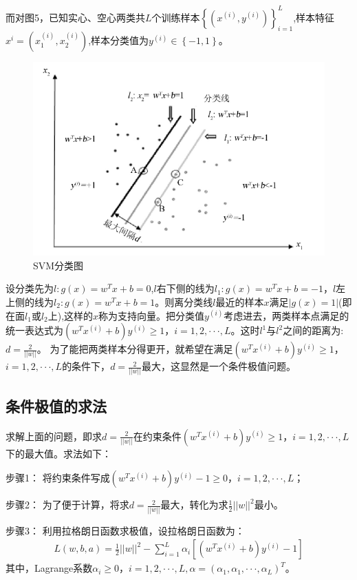\documentclass[12pt,a4paper]{article}%
\begin{document}
	而对图5，已知实心、空心两类共$L$个训练样本${\left\{\left({x}^{(i)},{y}^{(i)} \right) \right\}}_{i=1}^{L}$,样本特征${x}^{i}={\left({x}_1^{(i)},{x}_2^{(i)}\right)}$,样本分类值为${y}^{(i)}{\in}{\left\{-1,1\right\}} $。
	\begin{figure}[H]%
		\centering
		\begin{minipage}{0.83\textwidth}%
			\centering
			\includegraphics[width=0.8%
			\textwidth]{figure7}%
			\caption{\fontsize{10pt}{15pt}\selectfont SVM分类图}%
		\end{minipage}
	\end{figure}
	设分类先为$l:g(x)={w}^{T}x+b=0$,$l$右下侧的线为${l}_{1}:g(x)={w}^{T}x+b=-1$，$l$左上侧的线为${l}_{2}:g(x)={w}^{T}x+b=1$。则离分类线$l$最近的样本$x$满足$\left|g(x)=1\right|$(即在面${l}_{1}$或${l}_{2}$上),这样的$x$称为支持向量。把分类值${y}^{(i)}$考虑进去，两类样本点满足的统一表达式为${({w}^{T}{x}^{(i)}+b){y}^{(i)}\geq1}$，$i=1,2,···,L$。这时${l}^{1}$与${l}^{2}$之间的距离为:$d=\frac{2}{||w||}$。
	为了能把两类样本分得更开，就希望在满足${({w}^{T}{x}^{(i)}+b){y}^{(i)}\geq1}$，$i=1,2,···,L$的条件下，$d=\frac{2}{||w||}$最大，这显然是一个条件极值问题。
	\subsection{条件极值的求法}
	求解上面的问题，即求$d=\frac{2}{||w||}$在约束条件${({w}^{T}{x}^{(i)}+b){y}^{(i)}\geq1}$，$i=1,2,···,L$下的最大值。求法如下：
	
	步骤1： 将约束条件写成${({w}^{T}{x}^{(i)}+b){y}^{(i)}-1\geq0}$，$i=1,2,···,L$；
	
	步骤2： 为了便于计算，将求$d=\frac{2}{||w||}$最大，转化为求$\frac{1}{2}{||w||}^{2}$最小。
	
	步骤3：
	利用拉格朗日函数求极值，设拉格朗日函数为：
	\begin{align}
		L(w,b,a)=\frac{1}{2}{||w||}^{2}-\sum_{i=1}^{L} {\alpha}_{i}\left[{({w}^{T}{x}^{(i)}+b){y}^{(i)}-1}\right]
	\end{align}
	其中，Lagrange系数${\alpha}_{i}\geq0$，$i=1,2,···,L,\alpha={({\alpha}_{1},{\alpha}_{1},···,{\alpha}_{L})}^{T}$。
	
\end{document}
